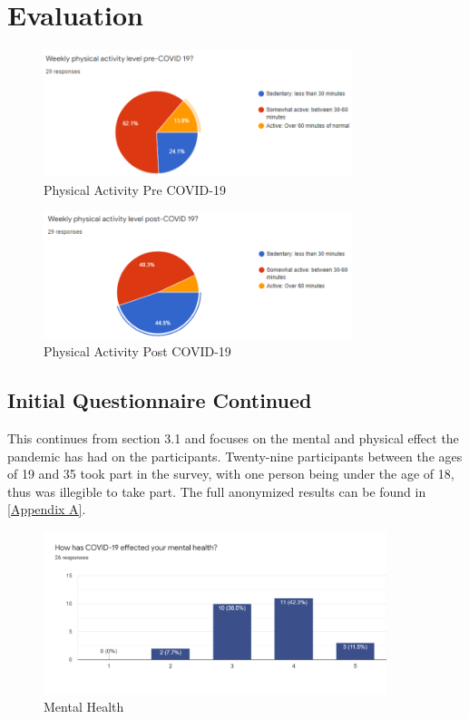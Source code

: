 \documentclass{l4proj}
\begin{document}
\chapter{Evaluation}


  \begin{figure}[h]
    \centering
     \includegraphics[width=90mm]{dissertation/images/17.png}
     \caption{Physical Activity Pre COVID-19}
     \setlength{\belowcaptionskip}{-10pt}
     \label{fig: Forms of exercise}
 \end{figure}
 
   \begin{figure}[h]
    \centering
     \includegraphics[width=90mm]{dissertation/images/18.png}
     \caption{Physical Activity Post COVID-19}
     \setlength{\belowcaptionskip}{-10pt}
     \label{fig: Forms of exercise}
 \end{figure}
 
\section{Initial Questionnaire Continued}
 This continues from section 3.1 and focuses on the mental and physical effect the pandemic has had on the participants. Twenty-nine participants between the ages of 19 and 35 took part in the survey, with one person being under the age of 18, thus was illegible to take part. The full anonymized results can be found in \ref{Appendix A}.

   \begin{figure}[h]
    \centering
     \includegraphics[width=100mm]{dissertation/images/19.png}
     \caption{Mental Health}
     \setlength{\belowcaptionskip}{-10pt}
     \label{fig: Forms of exercise}
 \end{figure}
 
\end{document}
